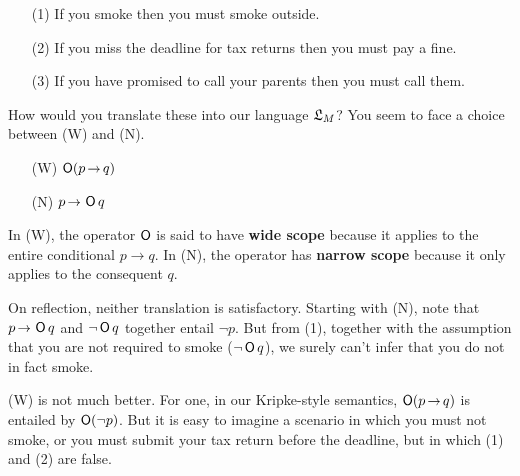 \begin{itemize}[leftmargin=10mm]
\itemsep-1mm
\item[(1)] If you smoke then you must smoke outside.
\item[(2)] If you miss the deadline for tax returns then you must pay a fine.
\item[(3)] If you have promised to call your parents then you must call them.
\end{itemize}
%
How would you translate these into our language $\mathfrak{L}_M$? You seem to face a choice
between (W) and (N).
\begin{itemize}[leftmargin=10mm]
\itemsep-1mm
\item[(W)] $\Ob(p \to q)$
\item[(N)] $p \to \Ob q$
\end{itemize}
In (W), the operator $\operatorname{\mathsf{O}}$ is said to have \textbf{wide scope} because it
applies to the entire conditional $p \to q$. In (N), the operator has
\textbf{narrow scope} because it only applies to the consequent $q$.

On reflection, neither translation is satisfactory. Starting with (N), note that
$p \to \Ob q$ and $\neg \operatorname{\mathsf{O}} q$ together entail $\neg p$. But from (1), together
with the assumption that you are not required to smoke ($\neg \operatorname{\mathsf{O}} q$), we surely
can't infer that you do not in fact smoke.

%

(W) is not much better. For one, in our Kripke-style semantics, $\Ob(p \to q)$
is entailed by $\operatorname{\mathsf{O}}(\neg p)$. But it is easy to imagine a scenario in which you
must not smoke, or you must submit your tax return before the deadline, but in
which (1) and (2) are false.


